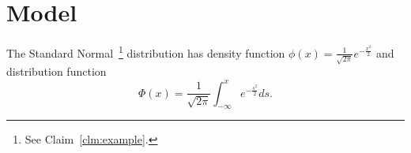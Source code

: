 
\section{Model}

The Standard Normal~\footnote{See Claim~\ref{clm:example}.} distribution has density function \( \phi(x) = \frac{1}{\sqrt{2 \pi}} e^{-\frac{x^2}{2}} \) and distribution function
\[
	\Phi(x) = \frac{1}{\sqrt{2 \pi}} \int_{-\infty}^x e^{-\frac{s^2}{2}}ds.
\]
